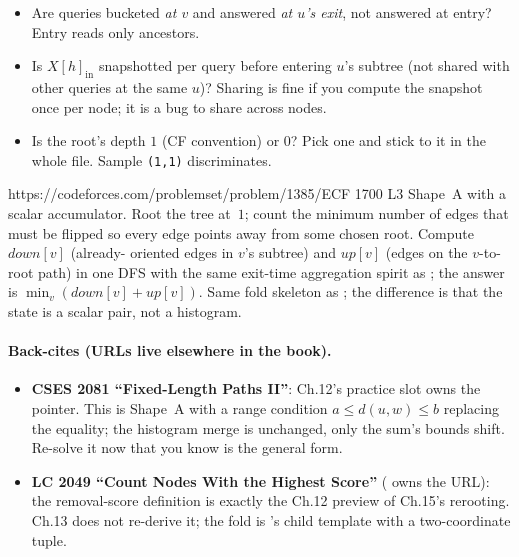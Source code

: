 \begin{stuckbox}
\begin{itemize}[nosep, leftmargin=1.4em]
  \item Are queries bucketed \emph{at $v$} and answered \emph{at $u$'s
        exit}, not answered at entry? Entry reads only ancestors.
  \item Is $\mathit{X}[h]_{\text{in}}$ snapshotted per query before
        entering $u$'s subtree (not shared with other queries at
        the same $u$)? Sharing is fine if you compute the snapshot
        once per node; it is a bug to share across nodes.
  \item Is the root's depth $1$ (CF convention) or $0$? Pick one and
        stick to it in the whole file. Sample \lstinline{(1,1)}
        discriminates.
\end{itemize}
\end{stuckbox}

\begin{practiceset}
    {https://codeforces.com/problemset/problem/1385/E}{CF 1700 L3}
    {Shape~A with a scalar accumulator. Root the tree at~$1$; count the
    minimum number of edges that must be flipped so every edge points
    away from some chosen root. Compute $\mathit{down}[v]$ (already-
    oriented edges in $v$'s subtree) and $\mathit{up}[v]$ (edges on the
    $v$-to-root path) in one DFS with the same exit-time aggregation
    spirit as ; the answer is
    $\min_v(\mathit{down}[v]+\mathit{up}[v])$. Same fold skeleton as
    ; the difference is that the state is a scalar
    pair, not a histogram.}
\end{practiceset}

\paragraph{Back-cites (URLs live elsewhere in the book).}
\begin{itemize}[nosep,leftmargin=1.4em]
  \item \textbf{CSES 2081 ``Fixed-Length Paths II''}: Ch.12's practice slot
        owns the pointer. This is Shape~A with a range condition
        $a \le d(u,w) \le b$ replacing the equality; the histogram merge
        is unchanged, only the sum's bounds shift. Re-solve it now that
        you know  is the general form.
  \item \textbf{LC 2049 ``Count Nodes With the Highest Score''}
        ( owns the URL): the removal-score definition is
        exactly the Ch.12 preview of Ch.15's rerooting. Ch.13 does not
        re-derive it; the fold is 's child template
        with a two-coordinate tuple.
\end{itemize}

